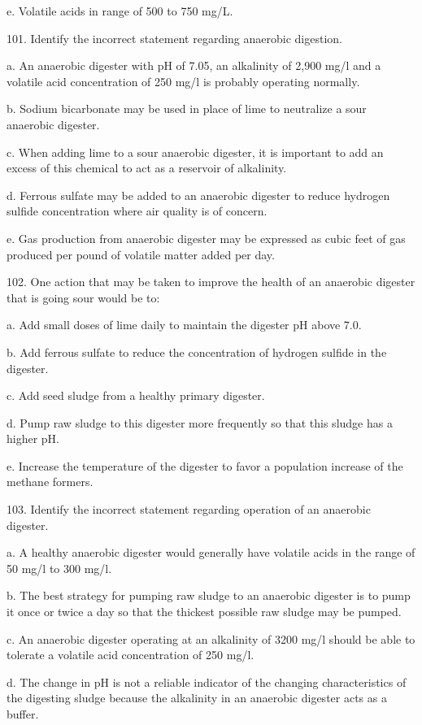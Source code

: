 \documentclass{article}
\begin{document}
e. Volatile acids in range of 500 to 750 mg/L. 


101. Identify the incorrect statement regarding anaerobic digestion. 

a. An anaerobic digester with pH of 7.05, an alkalinity of 2,900 mg/l and a volatile acid concentration of 250 mg/l is probably operating normally. 

b. Sodium bicarbonate may be used in place of lime to neutralize a sour anaerobic digester. 

c. When adding lime to a sour anaerobic digester, it is important to add an excess of this chemical to act as a reservoir of alkalinity. 

d. Ferrous sulfate may be added to an anaerobic digester to reduce hydrogen sulfide concentration where air quality is of concern. 

e. Gas production from anaerobic digester may be expressed as cubic feet of gas produced per pound of volatile matter added per day. 


102. One action that may be taken to improve the health of an anaerobic digester that is going sour would be to: 

a. Add small doses of lime daily to maintain the digester pH above 7.0. 

b. Add ferrous sulfate to reduce the concentration of hydrogen sulfide in the digester. 

c. Add seed sludge from a healthy primary digester. 

d. Pump raw sludge to this digester more frequently so that this sludge has a higher pH. 

e. Increase the temperature of the digester to favor a population increase of the methane formers. 


103. Identify the incorrect statement regarding operation of an anaerobic digester. 

a. A healthy anaerobic digester would generally have volatile acids in the range of 50 mg/l to 300 mg/l. 

b. The best strategy for pumping raw sludge to an anaerobic digester is to pump it once or twice a day so that the thickest possible raw sludge may be pumped. 

c. An anaerobic digester operating at an alkalinity of 3200 mg/l should be able to tolerate a volatile acid concentration of 250 mg/l. 

d. The change in pH is not a reliable indicator of the changing characteristics of the digesting sludge because the alkalinity in an anaerobic digester acts as a buffer. 
\end{document}
